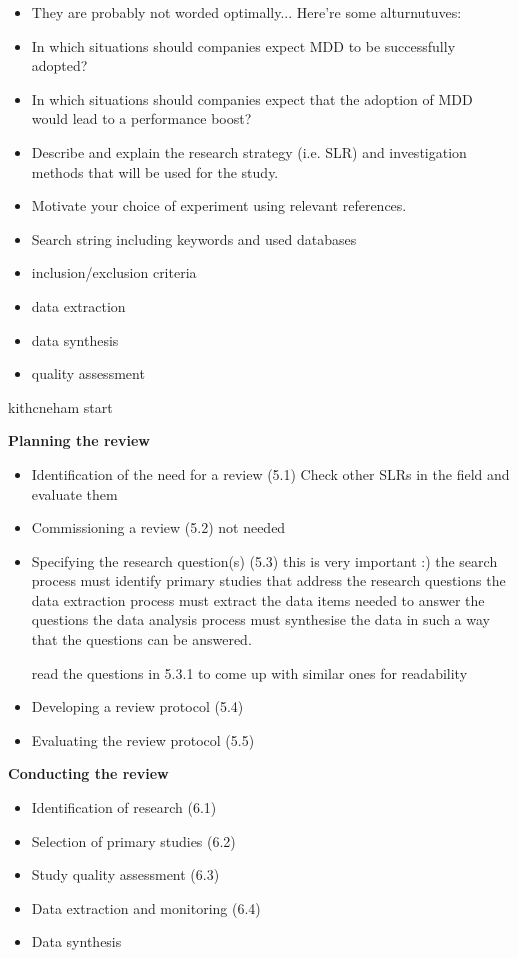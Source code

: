 \documentclass[10pt,twocolumn]{article}
\begin{document}
\begin{itemize}
\item They are probably not worded optimally... Here're some alturnutuves:
\item In which situations should companies expect MDD to be successfully adopted?
\item In which situations should companies expect that the adoption of MDD would lead to a performance boost?
\end{itemize}



\begin{itemize}
\item Describe and explain the research strategy (i.e. SLR) and investigation methods that will be used for the study. 
\item Motivate your choice of experiment using relevant references. 
\item Search string including keywords and used databases
\item inclusion/exclusion criteria
\item data extraction
\item data synthesis
\item quality assessment
\end{itemize}

kithcneham start

\textbf{Planning the review}
\begin{itemize}
\item Identification of the need for a review (5.1)
Check other SLRs in the field and evaluate them
\item Commissioning a review (5.2)
not needed
\item Specifying the research question(s) (5.3)
this is very important :)
the search process must identify primary studies that address the research questions
the data extraction process must extract the data items needed to answer the questions
the data analysis process must synthesise the data in such a way that the questions can be answered.

read the questions in 5.3.1 to come up with similar ones for readability

\item Developing a review protocol (5.4)

\item Evaluating the review protocol (5.5)
\end{itemize}

\textbf{Conducting the review}
\begin{itemize}
\item Identification of research (6.1)
\item Selection of primary studies (6.2)
\item Study quality assessment (6.3)
\item Data extraction and monitoring (6.4)
\item Data synthesis
\end{itemize}
\end{document}
